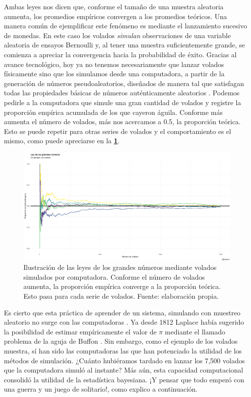 Ambas leyes nos dicen que, conforme el tamaño de una muestra aleatoria aumenta, los promedios empíricos convergen a los promedios teóricos. Una manera común de ejemplificar este fenómeno es mediante el lanzamiento sucesivo de monedas. En este caso los volados \textit{simulan} observaciones de una variable aleatoria de ensayos Bernoulli y, al tener una muestra suficientemente grande, se comienza a apreciar la convergencia hacia la probabilidad de éxito. Gracias al avance tecnológico, hoy ya no tenemos necesariamente que lanzar volados físicamente sino que los simulamos desde una computadora, a partir de la generación de números pseudoaleatorios, diseñados de manera tal que satisfagan todas las propiedades básicas de números auténticamente aleatorios \parencite{Ross13}. Podemos pedirle a la computadora que simule una gran cantidad de volados y registre la proporción empírica acumulada de los que cayeron águila. Conforme más aumenta el número de volados, más nos acercamos a 0.5, la proporción teórica. Esto se puede repetir para otras series de volados y el comportamiento es el mismo, como puede apreciarse en la \textbf{\ref{fig:LGN}}. \\

\begin{figure}[h]
	\centering
	\includegraphics[scale=0.25]{Figs/LGN}
	\caption{Ilustración de las leyes de los grandes números mediante volados simulados por computadora. Conforme el número de volados aumenta, la proporción empírica converge a la proporción teórica. Esto pasa para cada serie de volados. Fuente: elaboración propia.}
	\label{fig:LGN}	
\end{figure}

Es cierto que esta práctica de aprender de un sistema, simulando con muestreo aleatorio no surge con las computadoras \parencite{Owen13}. Ya desde 1812 Laplace había sugerido la posibilidad de estimar empíricamente el valor de $\pi$ mediante el llamado problema de la aguja de Buffon \parencite{Ragheb13}. Sin embargo, como el ejemplo de los volados muestra, sí han sido las computadoras las que han potenciado la utilidad de los métodos de simulación. ¿Cuánto hubiéramos tardado en lanzar los 7,500 volados que la computadora simuló al instante? Más aún, esta capacidad computacional consolidó la utilidad de la estadística bayesiana. ¡Y pensar que todo empezó con una guerra y un juego de solitario!, como explico a continuación.

